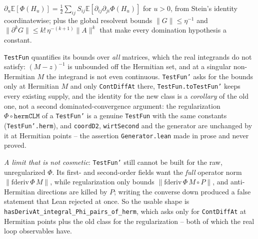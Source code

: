 \begin{theorem}[Generator identity for $H_u=\sqrt u\,X$ (moment route)]\label{thm:generator}
  \leanok{}
  $\partial_u\mathbb E[\Phi(H_u)]=\tfrac12\sum_{ij}S_{ij}\mathbb E[\partial_{ij}\partial_{ji}\Phi(H_u)]$
  for $u>0$, from Stein's identity coordinatewise; plus the global resolvent bounds
  $\|G\|\le\eta^{-1}$ and $\|\partial^k G\|\le k!\,\eta^{-(k+1)}\|A\|^k$ that make every
  domination hypothesis a constant.

  \texttt{TestFun} quantifies its bounds over \emph{all} matrices, which the real integrands do
  not satisfy: $(M-z)^{-1}$ is unbounded off the Hermitian set, and at a singular non-Hermitian
  $M$ the integrand is not even continuous.  \texttt{TestFun'} asks for the bounds only at
  Hermitian $M$ and only \texttt{ContDiffAt} there, \texttt{TestFun.toTestFun'} keeps every
  existing supply, and the identity for the new class is a \emph{corollary} of the old one, not a
  second dominated-convergence argument: the regularization $\Phi\circ\texttt{hermCLM}$ of a
  \texttt{TestFun'} is a genuine \texttt{TestFun} with the same constants
  (\texttt{TestFun'.herm}), and \texttt{coordD2}, \texttt{wirtSecond} and the generator are
  unchanged by it at Hermitian points -- the assertion \texttt{Generator.lean} made in prose and
  never proved.

  \emph{A limit that is not cosmetic}: \texttt{TestFun'} still cannot be built for the raw,
  unregularized $\Phi$.  Its first- and second-order fields want the \emph{full} operator norm
  $\|\mathrm{fderiv}\,\Phi\,M\|$, while regularization only bounds
  $\|\mathrm{fderiv}\,\Phi\,M\circ P\|$, and anti-Hermitian directions are killed by $P$; writing
  the converse down produced a false statement that Lean rejected at once.  So the usable shape
  is \texttt{hasDerivAt\_integral\_Phi\_pairs\_of\_herm}, which asks only for
  \texttt{ContDiffAt} at Hermitian points plus the old class for the regularization -- both of
  which the real loop observables have.
\end{theorem}
